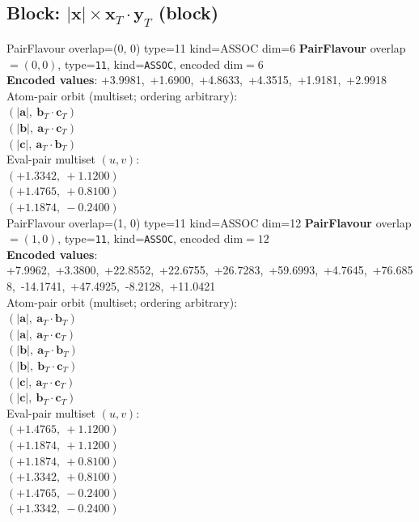 \documentclass[a4paper,11pt]{article}
\newcommand{\vc}[1]{\ensuremath{\mathbf{#1}}}
\newcommand{\dnfagmiihhiejm}[1]{|\vc{#1}|}
\newcommand{\fpbeomcfokjooi}[2]{\mathbf{#1}_T \cdot \mathbf{#2}_T}
\begin{document}
\subsection{Block: $\dnfagmiihhiejm{x} \times \fpbeomcfokjooi{x}{y}$  (block)}
    PairFlavour  overlap=(0, 0)  type=11  kind=ASSOC  dim=6
\textbf{PairFlavour} overlap$=(0, 0)$, type=\texttt{11}, kind=\texttt{ASSOC}, encoded dim$=6$\\
\textbf{      Encoded values}: +3.9981,\ +1.6900,\ +4.8633,\ +4.3515,\ +1.9181,\ +2.9918\\
\quad Atom-pair orbit (multiset; ordering arbitrary):\\
$(\dnfagmiihhiejm{a},\ \fpbeomcfokjooi{b}{c})$\\
$(\dnfagmiihhiejm{b},\ \fpbeomcfokjooi{a}{c})$\\
$(\dnfagmiihhiejm{c},\ \fpbeomcfokjooi{a}{b})$\\
\quad Eval-pair multiset $(u, v)$:\\
$(+1.3342,\ +1.1200)$\\
$(+1.4765,\ +0.8100)$\\
$(+1.1874,\ -0.2400)$\\
    PairFlavour  overlap=(1, 0)  type=11  kind=ASSOC  dim=12
\textbf{PairFlavour} overlap$=(1, 0)$, type=\texttt{11}, kind=\texttt{ASSOC}, encoded dim$=12$\\
\textbf{      Encoded values}: +7.9962,\ +3.3800,\ +22.8552,\ +22.6755,\ +26.7283,\ +59.6993,\ +4.7645,\ +76.6858,\ -14.1741,\ +47.4925,\ -8.2128,\ +11.0421\\
\quad Atom-pair orbit (multiset; ordering arbitrary):\\
$(\dnfagmiihhiejm{a},\ \fpbeomcfokjooi{a}{b})$\\
$(\dnfagmiihhiejm{a},\ \fpbeomcfokjooi{a}{c})$\\
$(\dnfagmiihhiejm{b},\ \fpbeomcfokjooi{a}{b})$\\
$(\dnfagmiihhiejm{b},\ \fpbeomcfokjooi{b}{c})$\\
$(\dnfagmiihhiejm{c},\ \fpbeomcfokjooi{a}{c})$\\
$(\dnfagmiihhiejm{c},\ \fpbeomcfokjooi{b}{c})$\\
\quad Eval-pair multiset $(u, v)$:\\
$(+1.4765,\ +1.1200)$\\
$(+1.1874,\ +1.1200)$\\
$(+1.1874,\ +0.8100)$\\
$(+1.3342,\ +0.8100)$\\
$(+1.4765,\ -0.2400)$\\
$(+1.3342,\ -0.2400)$\\
\end{document}
